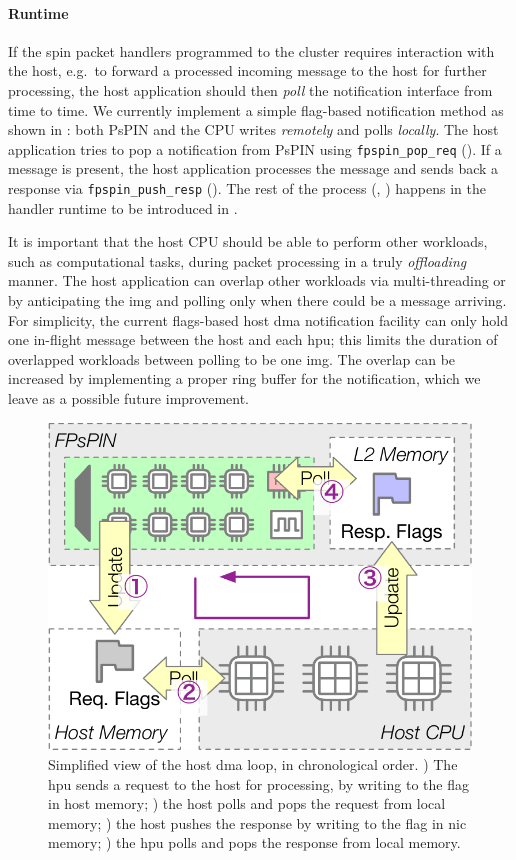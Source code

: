 \paragraph{Runtime} If the \ac{spin} packet handlers programmed to the cluster requires interaction with the host, e.g.\ to forward a processed incoming message to the host for further processing, the host application should then \emph{poll} the notification interface from time to time.  We currently implement a simple flag-based notification method as shown in : both PsPIN and the CPU writes \emph{remotely} and polls \emph{locally}.  The host application tries to pop a notification from PsPIN using \texttt{fpspin\_\-pop\_\-req} ().  If a message is present, the host application processes the message and sends back a response via \texttt{fpspin\_\-push\_\-resp} ().  The rest of the process (, ) happens in the handler runtime to be introduced in .

It is important that the host CPU should be able to perform other workloads, such as computational tasks, during packet processing in a truly \emph{offloading} manner.  The host application can overlap other workloads via multi-threading or by anticipating the \ac{img} and polling only when there could be a message arriving.  For simplicity, the current flags-based host \ac{dma} notification facility can only hold one in-flight message between the host and each \ac{hpu}; this limits the duration of overlapped workloads between polling to be one \ac{img}.  The overlap can be increased by implementing a proper ring buffer for the notification, which we leave as a possible future improvement.

\begin{figure}[tp]
    \centering
    \includegraphics[width=.5\textwidth]{thesis/figures/host-dma-req-resp.pdf}
    \caption[Simplified view of the host \ac{dma} loop]{Simplified view of the host \ac{dma} loop, in chronological order.  ) The \ac{hpu} sends a request to the host for processing, by writing to the flag in host memory; ) the host polls and pops the request from local memory; ) the host pushes the response by writing to the flag in \ac{nic} memory; ) the \ac{hpu} polls and pops the response from local memory.} \label{fig:host-dma-req-resp}
\end{figure}

